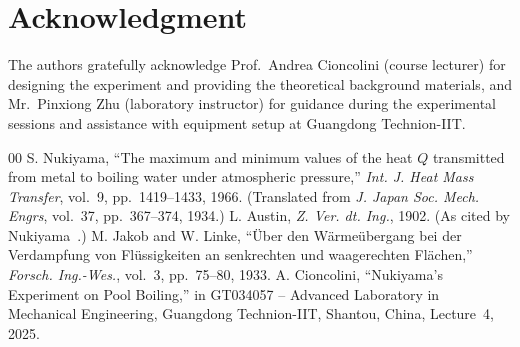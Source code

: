 \documentclass[conference]{IEEEtran}
\begin{document}
\section*{Acknowledgment}
The authors gratefully acknowledge Prof.~Andrea Cioncolini (course lecturer) for designing the experiment and providing the theoretical background materials, and Mr.~Pinxiong Zhu (laboratory instructor) for guidance during the experimental sessions and assistance with equipment setup at Guangdong Technion-IIT.

\begin{thebibliography}{00}
 S. Nukiyama, ``The maximum and minimum values of the heat $Q$ transmitted from metal to boiling water under atmospheric pressure,'' \textit{Int. J. Heat Mass Transfer}, vol.~9, pp.~1419--1433, 1966. (Translated from \textit{J. Japan Soc. Mech. Engrs}, vol.~37, pp.~367--374, 1934.)
 L. Austin, \textit{Z. Ver. dt. Ing.}, 1902. (As cited by Nukiyama~\cite{nukiyama1966}.)
 M. Jakob and W. Linke, ``\"Uber den W\"arme\"ubergang bei der Verdampfung von Fl\"ussigkeiten an senkrechten und waagerechten Fl\"achen,'' \textit{Forsch. Ing.-Wes.}, vol.~3, pp.~75--80, 1933.
 A. Cioncolini, ``Nukiyama's Experiment on Pool Boiling,'' in GT034057 -- Advanced Laboratory in Mechanical Engineering, Guangdong Technion-IIT, Shantou, China, Lecture~4, 2025.
\end{thebibliography}
\end{document}
